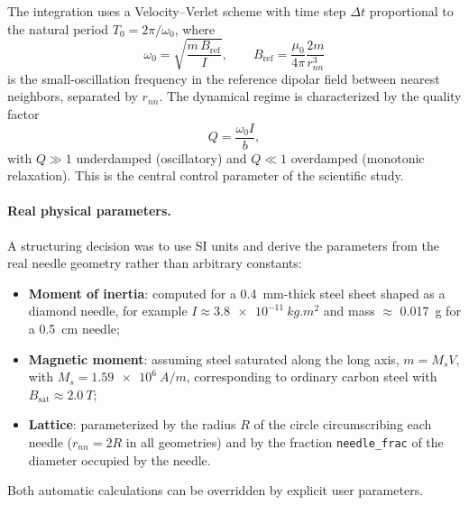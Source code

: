 \documentclass[11pt,a4paper]{article}
\newcommand{\code}[1]{\texttt{#1}}
\begin{document}
The integration uses a Velocity--Verlet scheme with time step $\Delta t$ proportional to the natural period $T_0 = 2\pi/\omega_0$, where
\begin{equation}
\omega_0 = \sqrt{\frac{m\,B_{\mathrm{ref}}}{I}},
\qquad
B_{\mathrm{ref}} = \frac{\mu_0}{4\pi}\frac{2m}{r_{nn}^{3}}
\end{equation}
is the small-oscillation frequency in the reference dipolar field between nearest neighbors, separated by $r_{nn}$. The dynamical regime is characterized by the quality factor
\begin{equation}
Q = \frac{\omega_0 I}{b},
\end{equation}
with $Q \gg 1$ underdamped (oscillatory) and $Q \ll 1$ overdamped (monotonic relaxation). This is the central control parameter of the scientific study.

\paragraph{Real physical parameters.}
A structuring decision was to use SI units and derive the parameters from the real needle geometry rather than arbitrary constants:
\begin{itemize}
\item \textbf{Moment of inertia}: computed for a \SI{0.4}{mm}-thick steel sheet shaped as a diamond needle, for example $I \approx \SI{3.8e-11}{kg.m^2}$ and mass $\approx$ \SI{0.017}{g} for a \SI{0.5}{cm} needle;
\item \textbf{Magnetic moment}: assuming steel saturated along the long axis, $m = M_s V$, with $M_s = \SI{1.59e6}{A/m}$, corresponding to ordinary carbon steel with $B_{\mathrm{sat}} \approx \SI{2.0}{T}$;
\item \textbf{Lattice}: parameterized by the radius $R$ of the circle circumscribing each needle ($r_{nn} = 2R$ in all geometries) and by the fraction \code{needle\_frac} of the diameter occupied by the needle.
\end{itemize}
Both automatic calculations can be overridden by explicit user parameters.
\end{document}
